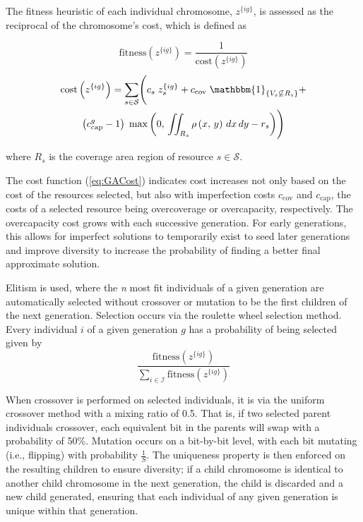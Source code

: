 \documentclass[12pt,dvipsnames]{report}
\begin{document}
The fitness heuristic of each individual chromosome, $z^{\{ig\}}$, is assessed as the reciprocal of the chromosome's cost, which is defined as

\begin{equation} \label{eq:GAFit}
\text{fitness}\left(z^{\{ig\}}\right) = \frac{1}{\text{cost}\left(z^{\{ig\}}\right)}
\end{equation}
\begin{multline} \label{eq:GACost}
\text{cost}\left(z^{\{ig\}}\right) = \sum_{s \in \mathcal{S}} \Biggl( c_s \; z_s^{\{ig\}} + c_\text{cov} \; \mathbbm{1}_{\left\{ V_s \not\subseteq R_s \right\}} + \\ \left(c_\text{cap}^g - 1\right) \; \max\left( 0,\, \iint_{R_s} \rho\left(x,\, y\right)\, dx\, dy - r_s \right) \Biggr)
\end{multline}

\noindent where $R_s$ is the coverage area region of resource $s \in \mathcal{S}$.

The cost function (\ref{eq:GACost}) indicates cost increases not only based on the cost of the resources selected, but also with imperfection costs $c_\text{cov}$ and $c_\text{cap}$, the costs of a selected resource being overcoverage or overcapacity, respectively.  The overcapacity cost grows with each successive generation.  For early generations, this allows for imperfect solutions to temporarily exist to seed later generations and improve diversity to increase the probability of finding a better final approximate solution.

Elitism is used, where the \textit{n} most fit individuals of a given generation are automatically selected without crossover or mutation to be the first children of the next generation.  Selection occurs via the roulette wheel selection method.  Every individual $i$ of a given generation $g$ has a probability of being selected given by
\[
\frac{\text{fitness}\left( z^{\{ig\}} \right)}{\sum_{i \in \mathcal{I}} \text{fitness}\left( z^{\{ig\}} \right)}
\]

When crossover is performed on selected individuals, it is via the uniform crossover method with a mixing ratio of 0.5.  That is, if two selected parent individuals crossover, each equivalent bit in the parents will swap with a probability of 50\%.  Mutation occurs on a bit-by-bit level, with each bit mutating (i.e., flipping) with probability $\frac{1}{S}$.  The uniqueness property is then enforced on the resulting children to ensure diversity; if a child chromosome is identical to another child chromosome in the next generation, the child is discarded and a new child generated, ensuring that each individual of any given generation is unique within that generation.
\end{document}
